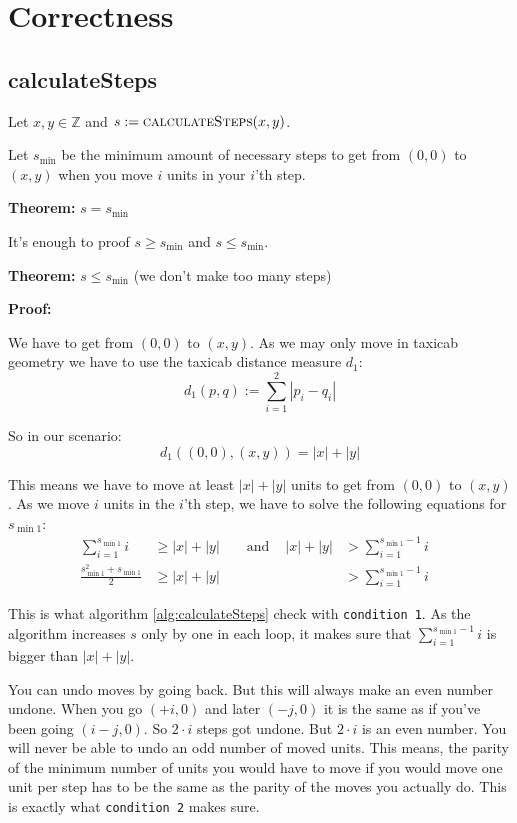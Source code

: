 \documentclass[a4paper]{scrartcl}
\newenvironment{myindentpar}[1]%
 {\begin{list}{}%
         {\setlength{\leftmargin}{#1}}%
         \item[]%
 }
 {\end{list}}
\begin{document}
\section{Correctness}
\subsection{calculateSteps}
Let $x,y \in \mathbb{Z}$ and $s := \Call{calculateSteps}{x, y}$.

Let $s_{\min}$ be the minimum amount of necessary steps to get from $(0,0)$
to $(x,y)$ when you move $i$ units in your $i$'th step.

\textbf{Theorem: } $s = s_{\min}$

It's enough to proof $s \geq s_{\min}$ and $s \leq s_{\min}$.

\begin{myindentpar}{1cm}
\textbf{Theorem: } $s \leq s_{\min}$ (we don't make too many steps)

\textbf{Proof: } 
\begin{myindentpar}{1cm}
We have to get from $(0,0)$ to $(x, y)$. As we may only move in
taxicab geometry we have to use the taxicab distance measure $d_1$:
\[d_1 \left (p, q \right ) := \sum_{i=1}^2 |p_i -q_i|\]

So in our scenario:
\[d_1 \left ((0,0), (x,y) \right ) = |x| + |y|\]

This means we have to move at least $|x| + |y|$ units to get 
from $(0,0)$ to $(x, y)$. As we move $i$ units in the $i$'th step,
we have to solve the following equations for $s_{\min1}$:
\begin{align}
    \sum_{i=1}^{s_{\min1}} i          &\geq |x| + |y| &&\text{ and } &|x| + |y|      &> \sum_{i=1}^{s_{\min1} - 1} i\\
    \frac{s_{\min1}^2 + s_{\min1}}{2} &\geq |x| + |y| &&             &               &> \sum_{i=1}^{s_{\min1} - 1} i & 
\end{align}

This is what algorithm \ref{alg:calculateSteps} check with \texttt{condition 1}. 
As the algorithm increases $s$ only by one in each loop, it makes 
sure that $\sum_{i=1}^{s_{\min1} - 1} i$ is bigger than $|x| + |y|$.

You can undo moves by going back. But this will always make an even
number undone. When you go $(+i, 0)$ and later $(-j, 0)$ it is the 
same as if you've been going $(i-j, 0)$. So $2\cdot i$ steps got undone.
But $2\cdot i$ is an even number. You will never be able to undo
an odd number of moved units. This means, the parity of the minimum 
number of units you would have to move if you would move one unit per
step has to be the same as the parity of the moves you actually do.
This is exactly what \texttt{condition 2} makes sure.


\end{myindentpar}
\end{myindentpar}
\end{document}
